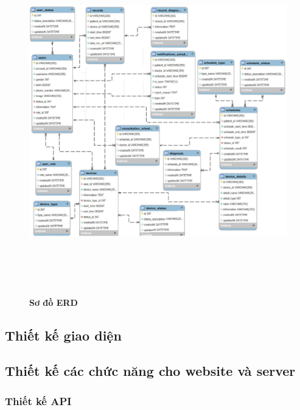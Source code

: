 \begin{figure}[H]
	\centering
	\includegraphics[width=15cm,height=15cm]{Images/system/fmECG_database.png}
	\caption[Sơ đồ ERD]{\bfseries \fontsize{12pt}{0pt}\selectfont Sơ đồ ERD}
	\label{fmECG_architecture-Database}
\end{figure}

\subsection{Thiết kế giao diện}

\subsection{Thiết kế các chức năng cho website và server}

\subsubsection{Thiết kế API}



